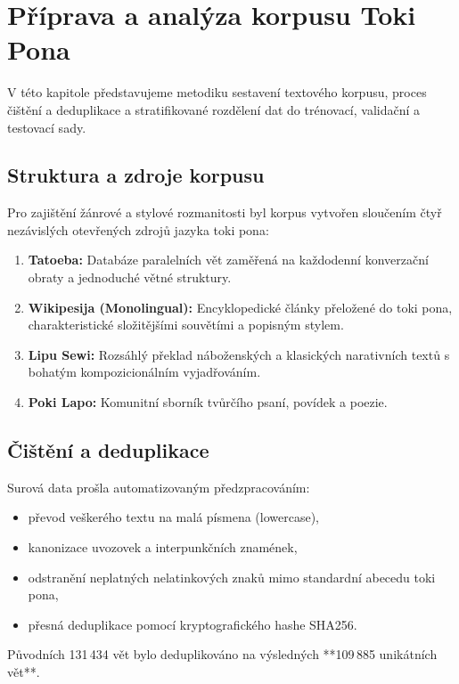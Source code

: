 \chapter{Příprava a analýza korpusu Toki Pona}
\label{chap:korpus}

V této kapitole představujeme metodiku sestavení textového korpusu, proces čištění a deduplikace a stratifikované rozdělení dat do trénovací, validační a testovací sady.

\section{Struktura a zdroje korpusu}
Pro zajištění žánrové a stylové rozmanitosti byl korpus vytvořen sloučením čtyř nezávislých otevřených zdrojů jazyka toki pona:
\begin{enumerate}
    \item \textbf{Tatoeba:} Databáze paralelních vět zaměřená na každodenní konverzační obraty a jednoduché větné struktury.
    \item \textbf{Wikipesija (Monolingual):} Encyklopedické články přeložené do toki pona, charakteristické složitějšími souvětími a popisným stylem.
    \item \textbf{Lipu Sewi:} Rozsáhlý překlad náboženských a klasických narativních textů s bohatým kompozicionálním vyjadřováním.
    \item \textbf{Poki Lapo:} Komunitní sborník tvůrčího psaní, povídek a poezie.
\end{enumerate}

\section{Čištění a deduplikace}
Surová data prošla automatizovaným předzpracováním:
\begin{itemize}
    \item převod veškerého textu na malá písmena (lowercase),
    \item kanonizace uvozovek a interpunkčních znamének,
    \item odstranění neplatných nelatinkových znaků mimo standardní abecedu toki pona,
    \item přesná deduplikace pomocí kryptografického hashe SHA256.
\end{itemize}

Původních 131\,434 vět bylo deduplikováno na výsledných **109\,885 unikátních vět**.

